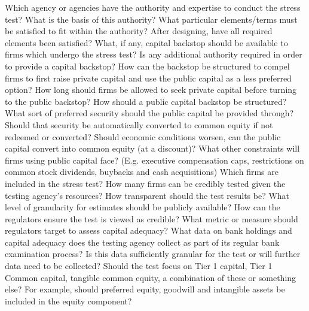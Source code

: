 \documentclass[justified, nobib]{tufte-handout2}
\begin{document}
\begin{outline}[enumerate]

\1 Which agency or agencies have the authority and expertise to conduct the stress test?
\2 What is the basis of this authority?
\2 What particular elements/terms must be satisfied to fit within the authority?
\2 After designing, have all required elements been satisfied?
\1 What, if any, capital backstop should be available to firms which undergo the stress test?
\2 Is any additional authority required in order to provide a capital backstop?
\2 How can the backstop be structured to compel firms to first raise private capital and use the public capital as a less preferred option?
\2 How long should firms be allowed to seek private capital before turning to the public backstop?
\1 How should a public capital backstop be structured?
\2 What sort of preferred security should the public capital be provided through? Should that security be automatically converted to common equity if not redeemed or converted?
\2 Should economic conditions worsen, can the public capital convert into common equity (at a discount)?
\2 What other constraints will firms using public capital face? (E.g. executive compensation caps, restrictions on common stock dividends, buybacks and cash acquisitions)
\1 Which firms are included in the stress test?
\2 How many firms can be credibly tested given the testing agency's resources?
\1 How transparent should the test results be? What level of granularity for estimates should be publicly available?
\1 How can the regulators ensure the test is viewed as credible?
\2 What metric or measure should regulators target to assess capital adequacy?
\3 What data on bank holdings and capital adequacy does the testing agency collect as part of its regular bank examination process? Is this data sufficiently granular for the test or will further data need to be collected?
\3 Should the test focus on Tier 1 capital, Tier 1 Common capital, tangible common equity, a combination of these or something else?
\4 For example, should preferred equity, goodwill and intangible assets be included in the equity component?

\end{outline}
\end{document}
